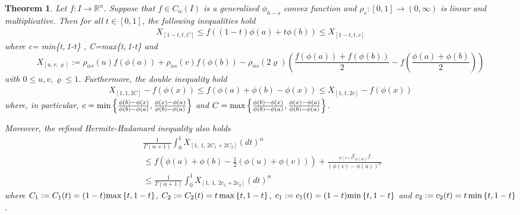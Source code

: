 \documentclass[10pt]{article}
\newtheorem{theo}{Theorem}[section]
\begin{document}
\begin{theo}\label{k9}
Let $f:I\rightarrow\mathbb{R}^\alpha$. Suppose that $f\in C_\alpha(I)$ is a generalised $\phi_{h-s}$ convex function and $\rho_{s}:[0,1]\rightarrow (0,\infty)$ is linear and multiplicative. Then for all $t\in[0,1]$, the following inequalities hold
\begin{align}
X_{[1-t,t,C]}\leq f((1-t)\phi(a)+t\phi(b))\leq X_{[1-t,t,c]}  \label{es2}
\end{align}
where c=\textnormal{ min}\{t,\,1-t\} , C=\textnormal{max}\{t,\,1-t\} and 
\[
X_{[u,v,\varrho]}:= \rho_{\alpha s}(u) f(\phi(a)) +\rho_{\alpha s} (v) f(\phi(b)) -\rho_{\alpha s}(2\varrho)\left(\frac{f(\phi(a))+f(\phi(b))}{2} -f\left( \frac{\phi(a)+\phi(b)}{2} \right)  \right)
\] with $0\leq u,v,\varrho\leq 1$. Furthermore, the double inequality hold
\begin{align}
X_{[1,1,2C]} -f(\phi(x)) \leq f(\phi(a)+\phi(b)-\phi(x)) \leq X_{[1,1,2c]} -f(\phi(x)) \label{ajz}
\end{align}
where, in particular, $c=\textnormal{min}\left\{\frac{\phi(b)-\phi(x)}{\phi(b)-\phi(a)}, \frac{\phi(x)-\phi(a)}{\phi(b)-\phi(a)}   \right\}$  and $C=\textnormal{max}\left\{\frac{\phi(b)-\phi(x)}{\phi(b)-\phi(a)}, \frac{\phi(x)-\phi(a)}{\phi(b)-\phi(a)}   \right\}$.  

Moreover, the refined Hermite-Hadamard inequality also holds
\begin{align}
&\frac{1}{\Gamma(\alpha +1)}\int_0^1 X_{[1,\, 1,\, 2C_1+2C_2]}(dt)^\alpha \,\,  \nonumber
\\&\leq f\left( \phi(a) +\phi(b) -\frac{1}{2}(\phi(u)+\phi(v) )  \right)+\frac{{}_{\phi(v)}\mathcal{J}_{\phi(u)}f }{(\phi(v)-\phi(u))^\alpha}\,\, \nonumber
\\&\leq \frac{1}{\Gamma(\alpha +1)}\int_0^1 X_{[1,\, 1,\, 2c_1+2c_2]}(dt)^\alpha \,\,  \nonumber
\end{align}
where $C_1:=C_1(t)=(1-t)\textnormal{max}\left\{t, 1-t   \right\}$,  $C_2:=C_2(t)=t\,\textnormal{max}\left\{t, 1-t   \right\} $,  $c_1:=c_1(t)=(1-t)\textnormal{min}\left\{t, 1-t   \right\}$ and $c_2:=c_2(t)=t\,\textnormal{min}\left\{t, 1-t   \right\} $.
\end{theo}
\end{document}
